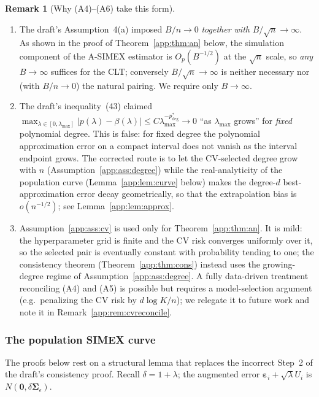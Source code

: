 \documentclass[11pt]{article}
\theoremstyle{plain}
\theoremstyle{definition}
\newtheorem{remark}{Remark}
\newcommand{\beps}{\bm{\varepsilon}}
\newcommand{\bSig}{\bm{\Sigma}}
\newcommand{\asimex}{\textup{A-SIMEX}}
\begin{document}
\begin{remark}[Why (A4)--(A6) take this form]
\leavevmode
\begin{enumerate}\itemsep2pt
\item[(i)] The draft's Assumption~4(a) imposed $B/n\to 0$ \emph{together
with} $B/\sqrt n\to\infty$. As shown in the proof of Theorem~\ref{app:thm:an}
below, the simulation component of the \asimex{} estimator is
$O_p(B^{-1/2})$ at the $\sqrt n$ scale, so \emph{any} $B\to\infty$
suffices for the CLT; conversely $B/\sqrt n\to\infty$ is neither necessary
nor (with $B/n\to 0$) the natural pairing. We require only $B\to\infty$.
\item[(ii)] The draft's inequality~(43) claimed
$\max_{\lambda\in[0,\lambda_{\max}]}|p(\lambda)-\beta(\lambda)|
\le C\lambda_{\max}^{-p^*_{\deg}}\to 0$ ``as $\lambda_{\max}$ grows'' for
\emph{fixed} polynomial degree. This is false: for fixed degree the
polynomial approximation error on a compact interval does not vanish as the
interval endpoint grows. The corrected route is to let the CV-selected
degree grow with $n$ (Assumption~\ref{app:ass:degree}) while the real-analyticity
of the population curve (Lemma~\ref{app:lem:curve} below) makes the
degree-$d$ best-approximation error decay geometrically, so that the
extrapolation bias is $o(n^{-1/2})$; see Lemma~\ref{app:lem:approx}.
\item[(iii)] Assumption~\ref{app:ass:cv} is used only for Theorem~\ref{app:thm:an}.
It is mild: the hyperparameter grid is finite and the CV risk converges
uniformly over it, so the selected pair is eventually constant with
probability tending to one; the consistency theorem
(Theorem~\ref{app:thm:cons}) instead uses the growing-degree regime of
Assumption~\ref{app:ass:degree}. A fully data-driven treatment reconciling
(A4) and (A5) is possible but requires a model-selection argument
(e.g.\ penalizing the CV risk by $d\log K/n$); we relegate it to future
work and note it in Remark~\ref{app:rem:cvreconcile}.
\end{enumerate}
\end{remark}

\subsubsection{The population SIMEX curve}\label{app:sec:population}

The proofs below rest on a structural lemma that replaces the incorrect
Step~2 of the draft's consistency proof. Recall
$\delta=1+\lambda$; the augmented error $\beps_i+\sqrt\lambda U_i$ is
$N(\bm 0,\delta\bSig_\epsilon)$.
\end{document}
